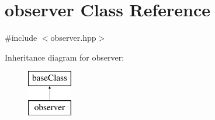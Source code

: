 \hypertarget{classobserver}{\section{observer Class Reference}
\label{classobserver}
}


{\ttfamily \#include $<$observer.\-hpp$>$}

Inheritance diagram for observer\-:\begin{figure}[H]
\begin{center}
\leavevmode
\includegraphics[height=2.000000cm]{classobserver}
\end{center}
\end{figure}


